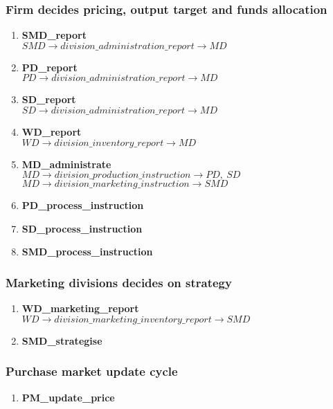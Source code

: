 \documentclass[11pt]{article}
\begin{document}
\subsubsection{Firm decides pricing, output target and funds allocation}
\begin{enumerate}
	\item \textbf{SMD\_report} \\
	$ SMD \rightarrow division\_administration\_report \rightarrow MD $
	\item \textbf{PD\_report} \\
	$ PD \rightarrow division\_administration\_report \rightarrow MD $
	\item \textbf{SD\_report} \\
	$ SD \rightarrow division\_administration\_report \rightarrow MD $
	\item \textbf{WD\_report} \\
	$ WD \rightarrow division\_inventory\_report \rightarrow MD $
	\item \textbf{MD\_administrate} \\
	$ MD \rightarrow division\_production\_instruction \rightarrow PD,\ SD $ \\
	$ MD \rightarrow division\_marketing\_instruction \rightarrow SMD $
	\item \textbf{PD\_process\_instruction}
	\item \textbf{SD\_process\_instruction}
	\item \textbf{SMD\_process\_instruction}
\end{enumerate}

\subsubsection{Marketing divisions decides on strategy}
\begin{enumerate}
	\item \textbf{WD\_marketing\_report} \\
	$ WD \rightarrow division\_marketing\_inventory\_report \rightarrow SMD $
	\item \textbf{SMD\_strategise}
\end{enumerate}

\subsubsection{Purchase market update cycle}
\begin{enumerate}
	\item \textbf{PM\_update\_price}
\end{enumerate}
\end{document}

